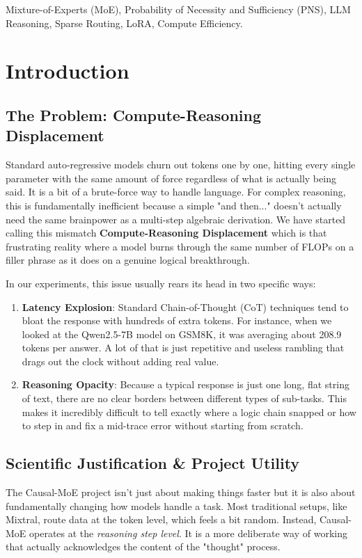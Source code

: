 \documentclass[conference,compsoc]{IEEEtran}
\begin{document}
\begin{IEEEkeywords}
Mixture-of-Experts (MoE), Probability of Necessity and Sufficiency (PNS), LLM Reasoning, Sparse Routing, LoRA, Compute Efficiency.
\end{IEEEkeywords}

\section{Introduction}

\subsection{The Problem: Compute-Reasoning Displacement}
Standard auto-regressive models churn out tokens one by one, hitting every single parameter with the same amount of force regardless of what is actually being said. It is a bit of a brute-force way to handle language. For complex reasoning, this is fundamentally inefficient because a simple "and then..." doesn't actually need the same brainpower as a multi-step algebraic derivation. We have started calling this mismatch \textbf{Compute-Reasoning Displacement} which is that frustrating reality where a model burns through the same number of FLOPs on a filler phrase as it does on a genuine logical breakthrough.

In our experiments, this issue usually rears its head in two specific ways:
\begin{enumerate}
    \item \textbf{Latency Explosion}: Standard Chain-of-Thought (CoT) techniques tend to bloat the response with hundreds of extra tokens. For instance, when we looked at the Qwen2.5-7B model on GSM8K, it was averaging about 208.9 tokens per answer. A lot of that is just repetitive and useless rambling that drags out the clock without adding real value.
    \item \textbf{Reasoning Opacity}: Because a typical response is just one long, flat string of text, there are no clear borders between different types of sub-tasks. This makes it incredibly difficult to tell exactly where a logic chain snapped or how to step in and fix a mid-trace error without starting from scratch.
\end{enumerate}

\subsection{Scientific Justification \& Project Utility}
The Causal-MoE project isn't just about making things faster but it is also about fundamentally changing how models handle a task. Most traditional setups, like Mixtral, route data at the token level, which feels a bit random. Instead, Causal-MoE operates at the \textit{reasoning step level}. It is a more deliberate way of working that actually acknowledges the content of the "thought" process. 
\end{document}
